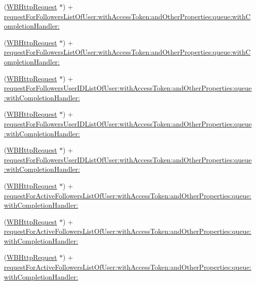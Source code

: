 \begin{DoxyCompactItemize}
\item 
(\mbox{\hyperlink{interface_w_b_http_request}{W\+B\+Http\+Request}} $\ast$) + \mbox{\hyperlink{interface_w_b_http_request_a0437dae63fa8fe40c7c5b323b45e0094}{request\+For\+Followers\+List\+Of\+User\+:with\+Access\+Token\+:and\+Other\+Properties\+:queue\+:with\+Completion\+Handler\+:}}
\item 
(\mbox{\hyperlink{interface_w_b_http_request}{W\+B\+Http\+Request}} $\ast$) + \mbox{\hyperlink{interface_w_b_http_request_a0437dae63fa8fe40c7c5b323b45e0094}{request\+For\+Followers\+List\+Of\+User\+:with\+Access\+Token\+:and\+Other\+Properties\+:queue\+:with\+Completion\+Handler\+:}}
\item 
(\mbox{\hyperlink{interface_w_b_http_request}{W\+B\+Http\+Request}} $\ast$) + \mbox{\hyperlink{interface_w_b_http_request_a62303f19ac35267cff108384061f1de7}{request\+For\+Followers\+User\+I\+D\+List\+Of\+User\+:with\+Access\+Token\+:and\+Other\+Properties\+:queue\+:with\+Completion\+Handler\+:}}
\item 
(\mbox{\hyperlink{interface_w_b_http_request}{W\+B\+Http\+Request}} $\ast$) + \mbox{\hyperlink{interface_w_b_http_request_a62303f19ac35267cff108384061f1de7}{request\+For\+Followers\+User\+I\+D\+List\+Of\+User\+:with\+Access\+Token\+:and\+Other\+Properties\+:queue\+:with\+Completion\+Handler\+:}}
\item 
(\mbox{\hyperlink{interface_w_b_http_request}{W\+B\+Http\+Request}} $\ast$) + \mbox{\hyperlink{interface_w_b_http_request_a62303f19ac35267cff108384061f1de7}{request\+For\+Followers\+User\+I\+D\+List\+Of\+User\+:with\+Access\+Token\+:and\+Other\+Properties\+:queue\+:with\+Completion\+Handler\+:}}
\item 
(\mbox{\hyperlink{interface_w_b_http_request}{W\+B\+Http\+Request}} $\ast$) + \mbox{\hyperlink{interface_w_b_http_request_a158110b5d079d1ddd7baae029a8a36fb}{request\+For\+Active\+Followers\+List\+Of\+User\+:with\+Access\+Token\+:and\+Other\+Properties\+:queue\+:with\+Completion\+Handler\+:}}
\item 
(\mbox{\hyperlink{interface_w_b_http_request}{W\+B\+Http\+Request}} $\ast$) + \mbox{\hyperlink{interface_w_b_http_request_a158110b5d079d1ddd7baae029a8a36fb}{request\+For\+Active\+Followers\+List\+Of\+User\+:with\+Access\+Token\+:and\+Other\+Properties\+:queue\+:with\+Completion\+Handler\+:}}
\item 
(\mbox{\hyperlink{interface_w_b_http_request}{W\+B\+Http\+Request}} $\ast$) + \mbox{\hyperlink{interface_w_b_http_request_a158110b5d079d1ddd7baae029a8a36fb}{request\+For\+Active\+Followers\+List\+Of\+User\+:with\+Access\+Token\+:and\+Other\+Properties\+:queue\+:with\+Completion\+Handler\+:}}

\end{DoxyCompactItemize}
